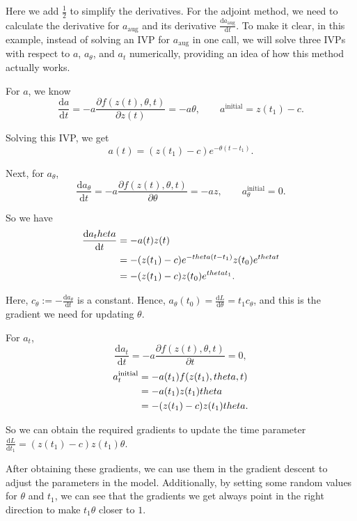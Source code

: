 \documentclass[a4paper,11pt,titlepage]{article}
\theoremstyle{definition}
\theoremstyle{plain}
\theoremstyle{remark}
\begin{document}
Here we add $\frac{1}{2}$ to simplify the derivatives.
For the adjoint method, we need to calculate the derivative for $a_{\mathrm{aug}}$ and its derivative $\frac{\mathrm{d}a_{\mathrm{aug}}}{\mathrm{d}t}$. To make it clear, in this example, instead of solving an IVP for $a_{\mathrm{aug}}$ in one call, we will solve three IVPs with respect to $a$, $a_\theta$, and $a_t$ numerically, providing an idea of how this method actually works.

For $a$, we know $$\frac{\mathrm{d}{a}}{\mathrm{d}{t}}=-a\frac{\partial f(z(t),\theta,t)}{\partial z(t)}=-a\theta,\quad\quad a^{\mathrm{initial}} = z(t_1)-c.$$

Solving this IVP, we get $$a(t)= (z(t_1)-c)e^{-\theta(t-t_1)}.$$

Next, for $a_\theta$, $$\frac{\mathrm{d}{a_\theta}}{\mathrm{d}{t}}=-a\frac{\partial f(z(t),\theta,t)}{\partial \theta}=-az,\quad\quad a^{\mathrm{initial}}_\theta=0.$$

So we have
\begin{align}
\frac{\mathrm{d}{a_\theta}}{\mathrm{d}{t}}&=-a(t)z(t)\notag\\
&= -(z(t_1)-c)e^{-\theta(t-t_1)}z(t_0)e^{\theta t}\notag\\
&= -(z(t_1)-c)z(t_0)e^{\theta t_1}.\notag
\end{align}

Here, $c_\theta:=-\frac{\mathrm{d}{a_\theta}}{\mathrm{d}{t}}$ is a constant. Hence, $a_\theta(t_0) =\frac{\mathrm{d}L}{\mathrm{d}\theta} =t_1c_\theta$, and this is the gradient we need for updating $\theta$.

For $a_t$,
$$
\frac{\mathrm{d}{a_t}}{\mathrm{d}{t}}=-a\frac{\partial f(z(t),\theta,t)}{\partial t}=0,
$$
\begin{align}
a^{\mathrm{initial}}_t &= -a(t_1)f(z(t_1),\theta,t)\notag\\
&=-a(t_1)z(t_1)\theta\notag\\
&=-(z(t_1)-c)z(t_1)\theta.\notag
\end{align}

So we can obtain the required gradients to update the time parameter $\frac{\mathrm{d}L}{\mathrm{d}t_1}=(z(t_1)-c)z(t_1)\theta$.

After obtaining these gradients, we can use them in the gradient descent to adjust the parameters in the model. Additionally, by setting some random values for $\theta$ and $t_1$, we can see that the gradients we get always point in the right direction to make $t_1\theta$ closer to $1$.

\pagebreak
\end{document}
